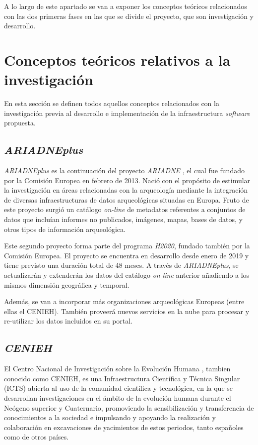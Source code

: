 
A lo largo de este apartado se van a exponer los conceptos teóricos
relacionados con las dos primeras fases en las que se divide el
proyecto, que son investigación y desarrollo.

\section{Conceptos teóricos relativos a la investigación}

En esta sección se definen todos aquellos conceptos relacionados con la
investigación previa al desarrollo e implementación de la
infraestructura \emph{software} propuesta.

\subsection{\emph{ARIADNEplus}}

\emph{ARIADNEplus} \cite{arip:web} es la continuación del
proyecto \emph{ARIADNE} \cite{ari:web}, el cual fue fundado
por la Comisión Europea en febrero de 2013. Nació con el propósito de
estimular la investigación en áreas relacionadas con la arqueología
mediante la integración de diversas infraestructuras de datos
arqueológicas situadas en Europa. Fruto de este proyecto surgió un
catálogo \emph{on-line} de metadatos referentes a conjuntos de datos
que incluían informes no publicados, imágenes, mapas, bases de datos, y
otros tipos de información arqueológica.

Este segundo proyecto forma parte del programa \emph{H2020}, fundado
también por la Comisión Europea. El proyecto se encuentra en desarrollo
desde enero de 2019 y tiene previsto una duración total de 48 meses. A
través de \emph{ARIADNEplus}, se actualizarán y extenderán los datos del
catálogo \emph{on-line} anterior añadiendo a los mismos dimensión
geográfica y temporal. 

Además, se van a incorporar más organizaciones
arqueológicas Europeas (entre ellas el CENIEH). También proveerá nuevos
servicios en la nube para procesar y re-utilizar los datos incluidos en
su portal.

\subsection{\emph{CENIEH}}

El Centro Nacional de Investigación sobre la Evolución
Humana \cite{cenieh:web}, tambien conocido como
CENIEH, es una Infraestructura Científica y Técnica Singular (ICTS)
abierta al uso de la comunidad científica y tecnológica, en la que se
desarrollan investigaciones en el ámbito de la evolución humana durante
el Neógeno superior y Cuaternario, promoviendo la sensibilización y
transferencia de conocimientos a la sociedad e impulsando y apoyando la
realización y colaboración en excavaciones de yacimientos de estos
periodos, tanto españoles como de otros países.

